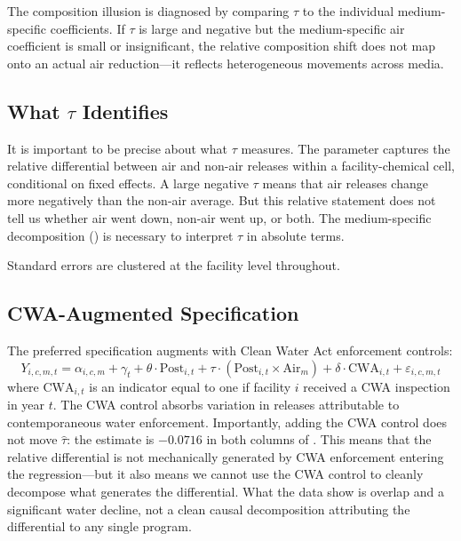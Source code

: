 \documentclass[12pt]{article}
\begin{document}
The composition illusion is diagnosed by comparing $\tau$ to the individual medium-specific coefficients. If $\tau$ is large and negative but the medium-specific air coefficient is small or insignificant, the relative composition shift does not map onto an actual air reduction---it reflects heterogeneous movements across media.

\subsection{What $\tau$ Identifies}

It is important to be precise about what $\tau$ measures. The parameter captures the relative differential between air and non-air releases within a facility-chemical cell, conditional on fixed effects. A large negative $\tau$ means that air releases change more negatively than the non-air average. But this relative statement does not tell us whether air went down, non-air went up, or both. The medium-specific decomposition () is necessary to interpret $\tau$ in absolute terms.

Standard errors are clustered at the facility level throughout.

\subsection{CWA-Augmented Specification}

The preferred specification augments  with Clean Water Act enforcement controls:
\begin{equation}
\label{eq:cwa}
Y_{i,c,m,t} = \alpha_{i,c,m} + \gamma_t + \theta \cdot \text{Post}_{i,t} + \tau \cdot (\text{Post}_{i,t} \times \text{Air}_m) + \delta \cdot \text{CWA}_{i,t} + \varepsilon_{i,c,m,t}
\end{equation}
where $\text{CWA}_{i,t}$ is an indicator equal to one if facility $i$ received a CWA inspection in year $t$. The CWA control absorbs variation in releases attributable to contemporaneous water enforcement. Importantly, adding the CWA control does not move $\hat{\tau}$: the estimate is $-0.0716$ in both columns of . This means that the relative differential is not mechanically generated by CWA enforcement entering the regression---but it also means we cannot use the CWA control to cleanly decompose what generates the differential. What the data show is overlap and a significant water decline, not a clean causal decomposition attributing the differential to any single program.
\end{document}
